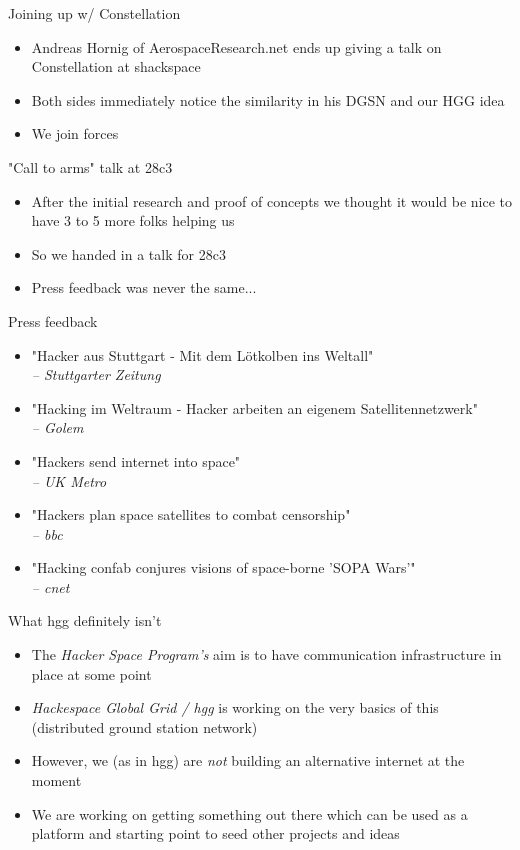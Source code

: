 	\begin{frame}{Joining up w/ Constellation}
		\begin{itemize}
			\item Andreas Hornig of AerospaceResearch.net ends up giving a talk on Constellation at shackspace
			\item Both sides immediately notice the similarity in his DGSN and our HGG idea
			\item We join forces
		\end{itemize}
	\end{frame}

	\begin{frame}{"Call to arms" talk at 28c3}
		\begin{itemize}
			\item After the initial research and proof of concepts we thought it would be nice to have 3 to 5 more folks helping us
			\item So we handed in a talk for 28c3
			\item Press feedback was never the same...
		\end{itemize}
	\end{frame}

	\begin{frame}{Press feedback}
		\begin{itemize}
			\item "Hacker aus Stuttgart - Mit dem Lötkolben ins Weltall"\\ \footnotesize{\emph{-- Stuttgarter Zeitung}}
			\item "Hacking im Weltraum - Hacker arbeiten an eigenem Satellitennetzwerk"\\ \footnotesize{\emph{-- Golem}}
			\item "Hackers send internet into space"\\ \footnotesize{\emph{-- UK Metro}}
			\item "Hackers plan space satellites to combat censorship"\\ \footnotesize{\emph{-- bbc}}
			\item "Hacking confab conjures visions of space-borne 'SOPA Wars'"\\ \footnotesize{\emph{-- cnet}}
		\end{itemize}
	\end{frame}

	\begin{frame}{What hgg definitely isn't}
		\begin{itemize}
			\item The \emph{Hacker Space Program's} aim is to have communication infrastructure in place at some point
			\item \emph{Hackespace Global Grid / hgg} is working on the very basics of this (distributed ground station network)
			\item However, we (as in hgg) are \emph{not} building an alternative internet at the moment
			\item We are working on getting something out there which can be used as a platform and starting point to seed other projects and ideas
		\end{itemize}
	\end{frame}

